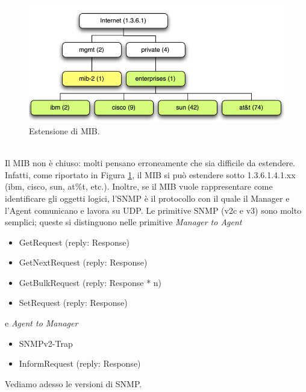 \begin{figure}[htbp]
	\centering
	\includegraphics[scale = 0.55]{images/mib-extensions}
	\caption{Estensione di MIB.}
	\label{img:mib-extensions}
\end{figure}\\
Il MIB non è chiuso: molti pensano erroneamente che sia difficile da estendere. Infatti, come riportato in Figura \ref{img:mib-extensions}, il MIB si può estendere sotto 1.3.6.1.4.1.xx (ibm, cisco, sun, at\%t, etc.). Inoltre, se il MIB vuole rappresentare come identificare gli oggetti logici, l'SNMP è il protocollo con il quale il Manager e l'Agent comunicano e lavora su UDP. Le primitive SNMP (v2c e v3) sono molto semplici; queste si distinguono nelle primitive \textit{Manager to Agent}
\begin{itemize}
	\item GetRequest (reply: Response)
	\item GetNextRequest (reply: Response)
	\item GetBulkRequest (reply: Response * n)
	\item SetRequest (reply: Response)
\end{itemize}
e \textit{Agent to Manager}
\begin{itemize}
	\item SNMPv2-Trap
	\item InformRequest (reply: Response)
\end{itemize}
Vediamo adesso le versioni di SNMP.
